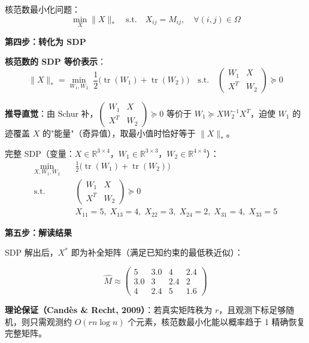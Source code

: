 \documentclass[12pt, a4paper]{ctexart}
\begin{document}
\begin{blackboard}
核范数最小化问题：
\[
\min_X \|X\|_* \quad \text{s.t.} \quad X_{ij} = M_{ij}, \quad \forall (i,j)\in\Omega
\]

\textbf{第四步：转化为 SDP}

\textbf{核范数的 SDP 等价表示}：
\[
\|X\|_* = \min_{W_1, W_2} \;\frac{1}{2}\bigl(\operatorname{tr}(W_1) + \operatorname{tr}(W_2)\bigr)
\quad \text{s.t.} \quad
\begin{pmatrix} W_1 & X \\ X^T & W_2 \end{pmatrix} \succeq 0
\]

\textbf{推导直觉}：由 Schur 补，$\begin{pmatrix}W_1 & X \\ X^T & W_2\end{pmatrix}\succeq 0$ 等价于 $W_1 \succeq XW_2^{-1}X^T$，迫使 $W_1$ 的迹覆盖 $X$ 的"能量"（奇异值），取最小值时恰好等于 $\|X\|_*$。

完整 SDP（变量：$X\in\mathbb{R}^{3\times 4}$，$W_1\in\mathbb{R}^{3\times 3}$，$W_2\in\mathbb{R}^{4\times 4}$）：
\[
\begin{aligned}
\min_{X,W_1,W_2} \quad & \frac{1}{2}\bigl(\operatorname{tr}(W_1) + \operatorname{tr}(W_2)\bigr) \\
\text{s.t.} \quad &
\begin{pmatrix} W_1 & X \\ X^T & W_2 \end{pmatrix} \succeq 0 \\
& X_{11}=5,\; X_{13}=4,\; X_{22}=3,\; X_{24}=2,\; X_{31}=4,\; X_{33}=5
\end{aligned}
\]

\textbf{第五步：解读结果}

SDP 解出后，$X^*$ 即为补全矩阵（满足已知约束的最低秩近似）：

\[
\hat{M} \approx \begin{pmatrix}
5 & 3.0 & 4 & 2.4 \\
3.0 & 3 & 2.4 & 2 \\
4 & 2.4 & 5 & 1.6
\end{pmatrix}
\]

\textbf{理论保证（Candès \& Recht, 2009）}：若真实矩阵秩为 $r$，且观测下标足够随机，则只需观测约 $O(rn\log n)$ 个元素，核范数最小化能以概率趋于 1 精确恢复完整矩阵。

\end{blackboard}
\end{document}
